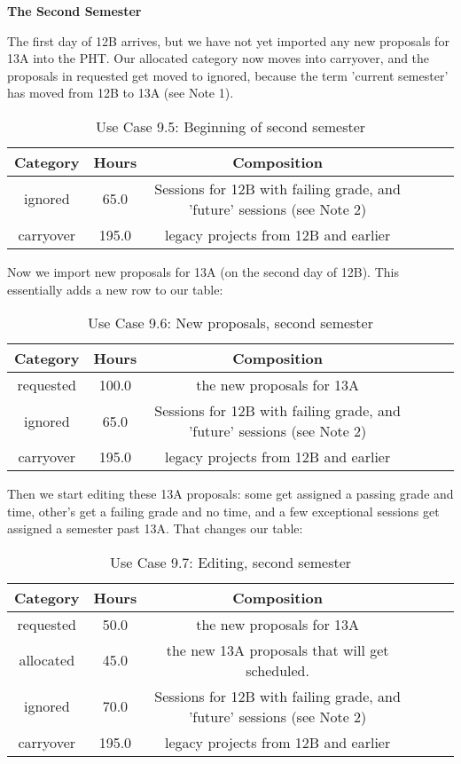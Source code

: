 \documentclass{article}
\begin{document}
{\bf The Second Semester}

The first day of 12B arrives, but we have not yet imported any new proposals for 13A into the PHT. Our allocated category now moves into carryover, and the proposals in requested get moved to ignored, because the term 'current semester' has moved from 12B to 13A (see Note 1).

\begin{table}
{\footnotesize
\caption{Use Case 9.5: Beginning of second semester\label{tab:time}}
\begin{tabular*}{1.05\textwidth}{@{\extracolsep{\fill}}cccccc}
\hline \hline
{\bf Category} & {\bf Hours} & {\bf Composition}\\
\hline
ignored & 65.0 & Sessions for 12B with failing grade, and 'future' sessions (see Note 2)\\
carryover & 195.0 & legacy projects from 12B and earlier\\
\hline \hline
\end{tabular*}
}
\end{table}

Now we import new proposals for 13A (on the second day of 12B). This essentially adds a new row to our table:

\begin{table}
{\footnotesize
\caption{Use Case 9.6: New proposals, second semester\label{tab:time}}
\begin{tabular*}{1.05\textwidth}{@{\extracolsep{\fill}}cccccc}
\hline \hline
{\bf Category} & {\bf Hours} & {\bf Composition}\\
\hline
requested & 100.0 & the new proposals for 13A\\
ignored & 65.0 & Sessions for 12B with failing grade, and 'future' sessions (see Note 2)\\
carryover & 195.0 & legacy projects from 12B and earlier\\
\hline \hline
\end{tabular*}
}
\end{table}

Then we start editing these 13A proposals: some get assigned a passing grade and time, other's get a failing grade and no time, and a few exceptional sessions get assigned a semester past 13A. That changes our table:

\begin{table}
{\footnotesize
\caption{Use Case 9.7: Editing, second semester\label{tab:time}}
\begin{tabular*}{1.05\textwidth}{@{\extracolsep{\fill}}cccccc}
\hline \hline
{\bf Category} & {\bf Hours} & {\bf Composition}\\
\hline
requested & 50.0 & the new proposals for 13A\\
allocated & 45.0 & the new 13A proposals that will get scheduled.\\
ignored & 70.0 & Sessions for 12B with failing grade, and 'future' sessions (see Note 2)\\
carryover & 195.0 & legacy projects from 12B and earlier\\
\hline \hline
\end{tabular*}
}
\end{table}
\end{document}
